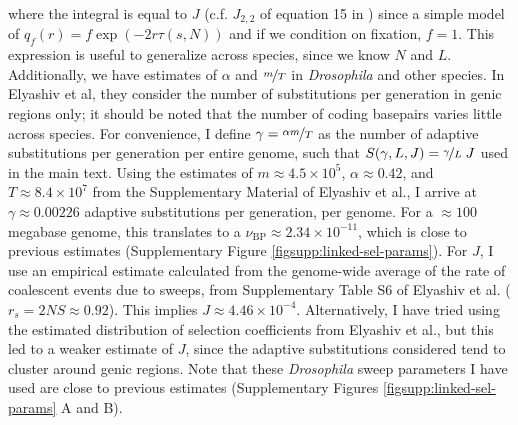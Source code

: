 \documentclass[9pt,lineno]{elife}
\begin{document}
\begin{appendixbox}
where the integral is equal to $J$ (c.f. $J_{2,2}$ of equation 15 in
\cite{Coop2012-cd}) since a simple model of $q_f(r) = f \exp(- 2r \tau(s, N))$
and if we condition on fixation, $f = 1$. This expression is useful to
generalize across species, since we know $N$ and $L$. Additionally, we have
estimates of $\alpha$ and $\nicefrac{m}{T}$ in \emph{Drosophila} and other
species. In Elyashiv et al, they consider the number of substitutions per
generation in genic regions only; it should be noted that the number of coding
basepairs varies little across species. For convenience, I define $\gamma =
\nicefrac{\alpha m}{T}$ as the number of adaptive substitutions per generation
per entire genome, such that $S(\gamma, L, J) = \nicefrac{\gamma}{L} \; J$ used
in the main text. Using the estimates of $m \approx 4.5 \times 10^{5}$, $\alpha
\approx 0.42$, and $T \approx 8.4 \times 10^{7}$ from the Supplementary
Material of Elyashiv et al., I arrive at $\gamma \approx 0.00226$ adaptive
substitutions per generation, per genome. For a $\approx 100$ megabase genome,
this translates to a $\nu_\text{BP} \approx 2.34 \times 10^{-11}$, which is
close to previous estimates (Supplementary Figure
\ref{figsupp:linked-sel-params}). For $J$, I use an empirical estimate
calculated from the genome-wide average of the rate of coalescent events due to
sweeps, from Supplementary Table S6 of Elyashiv et al. ($r_s = 2NS \approx
0.92$). This implies $J \approx 4.46 \times 10^{-4}$. Alternatively, I have
tried using the estimated distribution of selection coefficients from Elyashiv
et al., but this led to a weaker estimate of $J$, since the adaptive
substitutions considered tend to cluster around genic regions. Note that these
\emph{Drosophila} sweep parameters I have used are close to previous estimates
(Supplementary Figures \ref{figsupp:linked-sel-params} A and B). 

\end{appendixbox}
\end{document}
